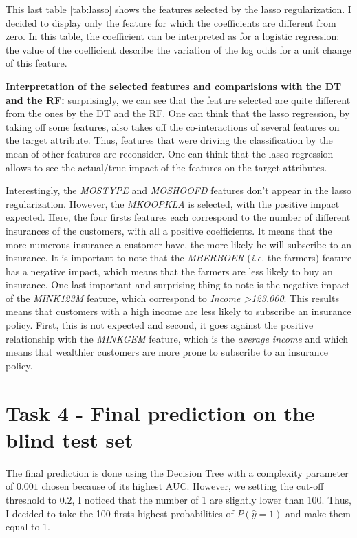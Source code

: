 \documentclass[
  12pt,
  oneside]{report}
\begin{document}
This last table \ref{tab:lasso} shows the features selected by the lasso regularization. I decided to display only the feature for which the coefficients are different from zero. In this table, the coefficient can be interpreted as for a logistic regression: the value of the coefficient describe the variation of the log odds for a unit change of this feature.

\textbf{Interpretation of the selected features and comparisions with the DT and the RF:} surprisingly, we can see that the feature selected are quite different from the ones by the DT and the RF. One can think that the lasso regression, by taking off some features, also takes off the co-interactions of several features on the target attribute. Thus, features that were driving the classification by the mean of other features are reconsider. One can think that the lasso regression allows to see the actual/true impact of the features on the target attributes.

Interestingly, the \emph{MOSTYPE} and \emph{MOSHOOFD} features don't appear in the lasso regularization. However, the \emph{MKOOPKLA} is selected, with the positive impact expected. Here, the four firsts features each correspond to the number of different insurances of the customers, with all a positive coefficients. It means that the more numerous insurance a customer have, the more likely he will subscribe to an insurance. It is important to note that the \emph{MBERBOER} (\emph{i.e.} the farmers) feature has a negative impact, which means that the farmers are less likely to buy an insurance. One last important and surprising thing to note is the negative impact of the \emph{MINK123M} feature, which correspond to \emph{Income \textgreater123.000}. This results means that customers with a high income are less likely to subscribe an insurance policy. First, this is not expected and second, it goes against the positive relationship with the \emph{MINKGEM} feature, which is the \emph{average income} and which means that wealthier customers are more prone to subscribe to an insurance policy.

\hypertarget{task-4---final-prediction-on-the-blind-test-set}{%
\chapter{Task 4 - Final prediction on the blind test set}\label{task-4---final-prediction-on-the-blind-test-set}}

The final prediction is done using the Decision Tree with a complexity parameter of \(0.001\) chosen because of its highest AUC. However, we setting the cut-off threshold to \(0.2\), I noticed that the number of 1 are slightly lower than 100. Thus, I decided to take the 100 firsts highest probabilities of \(P(\hat{y} = 1)\) and make them equal to 1.
\end{document}
